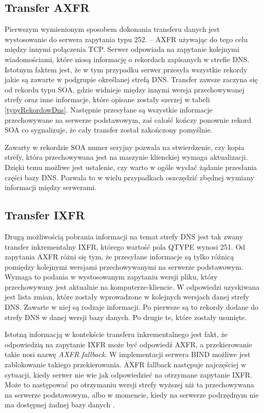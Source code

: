 \subsection{Transfer AXFR}
Pierwszym wymienionym sposobem dokonania transferu danych jest wystosowanie do serwera zapytania typu 252. -- AXFR \cite{RFC5936}
używając do tego celu między innymi połączenia TCP. Serwer odpowiada na zapytanie kolejnymi wiadomościami, które niosą informację o
rekordach zapisanych w strefie DNS. Istotnym faktem jest, że w tym przypadku serwer przesyła wszystkie rekordy jakie są zawarte w
podgrupie określanej strefą DNS. Transfer zawsze zaczyna się od rekordu typu SOA, gdzie widnieje między innymi wersja przechowywanej
strefy oraz inne informacje, które opisane zostały szerzej w tabeli \ref{typyRekordowDns}. Następnie przesyłane są wszystkie informacje
przechowywane na serwerze podstawowym, zaś całość kończy ponownie rekord SOA co sygnalizuje, że cały transfer został zakończony pomyślnie.

Zawarty w rekordzie SOA numer seryjny pozwala na stwierdzenie, czy kopia strefy, która przechowywana jest na maszynie klienckiej
wymaga aktualizacji. Dzięki temu możliwe jest ustalenie, czy warto w ogóle wysłać żądanie przesłania części bazy DNS. Pozwala to
w wielu przypadkach oszczędzić zbędnej wymiany informacji między serwerami.

\subsection{Transfer IXFR}
Drugą możliwością pobrania informacji na temat strefy DNS jest tak zwany transfer inkrementalny IXFR, którego wartość pola QTYPE
wynosi 251. Od zapytania AXFR różni się tym, że przesyłane informacje są tylko różnicą pomiędzy kolejnymi wersjami przechowywanymi
na serwerze podstawowym. Wymaga to podania w wystosowanym zapytaniu wersji pliku, który przechowywany jest aktualnie na
komputerze-kliencie. W odpowiedzi uzyskiwana jest lista zmian, które zostały wprowadzone w kolejnych wersjach danej strefy DNS.
Zawarte w niej są rodzaje informacji. Po pierwsze są to rekordy dodane do strefy DNS w danej wersji bazy danych.
Po drugie te, które zostały usunięte.

Istotną informacją w kontekście transferu inkrementalnego jest fakt, że odpowiedzią na zapytanie IXFR może być odpowiedź AXFR, a
przekierowanie takie nosi nazwę \textit{AXFR fallback}. W implementacji serwera BIND \cite{isc} możliwe jest zablokowanie takiego
przekierowania. AXFR fallback następuje najczęściej w sytuacji, kiedy serwer nie wie jak odpowiedzieć na otrzymane zapytanie IXFR.
Może to następować po otrzymaniu wersji strefy wyższej niż ta przechowywana na serwerze podstawowym, albo w momencie, kiedy na
serwerze podrzędnym nie ma dostępnej żadnej bazy danych \cite{I-D.song-dnsop-ixfr-fallback}.


